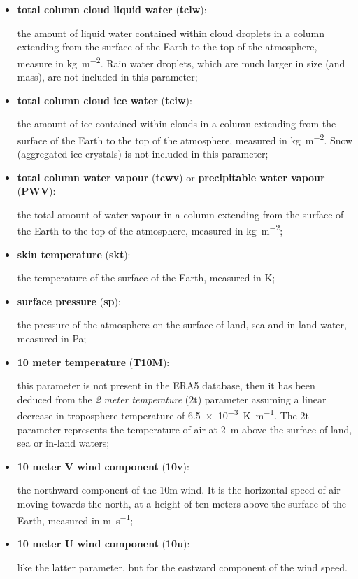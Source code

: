 \begin{itemize}
        \item \textbf{total column cloud liquid water} (\textbf{tclw}):

        the amount of liquid water contained within cloud
        droplets in a column extending from the surface of the Earth to the
        top of the atmosphere, measure in \si{\kilo\gram\per\square\meter}.
        Rain water droplets, which are much larger
        in size (and mass), are not included in this parameter;

        \item \textbf{total column cloud ice water} (\textbf{tciw}):

        the amount of ice contained within clouds in a column extending
        from the surface of the Earth to the top of the atmosphere,
        measured in \si{\kilo\gram\per\square\meter}. Snow
        (aggregated ice crystals) is not included in this parameter;

        \item \textbf{total column water vapour} (\textbf{tcwv})
        or \textbf{precipitable water vapour} (\textbf{PWV}):

        the total amount of water vapour in a column
        extending from the surface of the Earth to the top of the
        atmosphere, measured in \si{\kilo\gram\per\square\meter};

        \item \textbf{skin temperature} (\textbf{skt}):

        the temperature of the surface of the Earth, measured in
        \si{\kelvin};

        \item \textbf{surface pressure} (\textbf{sp}):

        the pressure of the atmosphere on the surface of land, sea and
        in-land water, measured in \si{\pascal};

        \item \textbf{10 meter temperature} (\textbf{T10M}):

        this parameter is not present in the ERA5 database, then it has
        been deduced from the \emph{2 meter temperature} (2t) parameter
        assuming a linear decrease in troposphere temperature of
        \SI{6.5e-3}{\kelvin\per\meter}. The 2t parameter represents the
        temperature of air at \SI{2}{\meter} above the surface of land, sea
        or in-land waters;

        \item \textbf{10 meter V wind component} (\textbf{10v}):

        the northward component of the 10m wind. It is the horizontal speed
        of air moving towards the north, at a height of ten meters above
        the surface of the Earth, measured in \si{\meter\per\second};

        \item \textbf{10 meter U wind component} (\textbf{10u}):

        like the latter parameter, but for the eastward component of the
        wind speed.
\end{itemize}

